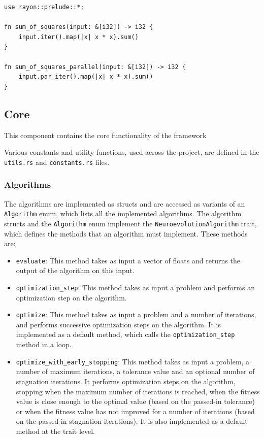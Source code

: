 \begin{lstlisting}[label=lst:sum_of_squares,caption=Sum of squares,float,frame=tb]
use rayon::prelude::*;

fn sum_of_squares(input: &[i32]) -> i32 {
    input.iter().map(|x| x * x).sum()
}

fn sum_of_squares_parallel(input: &[i32]) -> i32 {
    input.par_iter().map(|x| x * x).sum()
}
\end{lstlisting}


\subsection{Core}

This component contains the core functionality of the framework

Various constants and utility functions, used across the project, are defined in the \texttt{utils.rs} and \texttt{constants.rs} files.

\subsubsection{Algorithms}

The algorithms are implemented as structs and are accessed as variants of an \texttt{Algorithm} enum, which lists all the implemented algorithms.
The algorithm structs and the \texttt{Algorithm} enum implement the \texttt{NeuroevolutionAlgorithm} trait, which defines the methods that an algorithm must implement.
These methods are:

\begin{itemize}
    \item \texttt{evaluate}: This method takes as input a vector of floats and returns the output of the algorithm on this input.
    \item \texttt{optimization\_step}: This method takes as input a problem and performs an optimization step on the algorithm.
    \item \texttt{optimize}: This method takes as input a problem and a number of iterations, and performs successive optimization steps on the algorithm.
        It is implemented as a default method, which calls the \texttt{optimization\_step} method in a loop.
    \item \texttt{optimize\_with\_early\_stopping}: This method takes as input a problem, a number of maximum iterations, a tolerance value and an optional number of
        stagnation iterations. It performs optimization steps on the algorithm, stopping when the maximum number of iterations is reached, when the fitness value
        is close enough to the optimal value (based on the passed-in tolerance) or when the fitness value has not improved for a number of iterations (based on the
        passed-in stagnation iterations). It is also implemented as a default method at the trait level.
\end{itemize}

